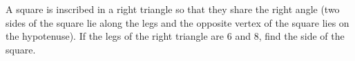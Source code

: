 A square is inscribed in a right triangle so that they share the right angle (two sides of the square lie along the legs and the opposite vertex of the square lies on the hypotenuse). If the legs of the right triangle are $6$ and $8$, find the side of the square.

